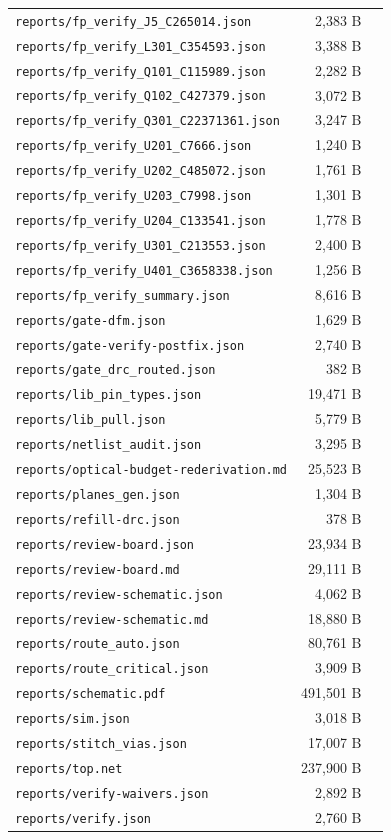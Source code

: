 \documentclass[11pt,a4paper]{article}
\begin{document}
{\begin{longtable}{p{9cm}rp{4cm}}
\texttt{reports/fp\_verify\_J5\_C265014.json} & 2,383 B &  \\
\texttt{reports/fp\_verify\_L301\_C354593.json} & 3,388 B &  \\
\texttt{reports/fp\_verify\_Q101\_C115989.json} & 2,282 B &  \\
\texttt{reports/fp\_verify\_Q102\_C427379.json} & 3,072 B &  \\
\texttt{reports/fp\_verify\_Q301\_C22371361.json} & 3,247 B &  \\
\texttt{reports/fp\_verify\_U201\_C7666.json} & 1,240 B &  \\
\texttt{reports/fp\_verify\_U202\_C485072.json} & 1,761 B &  \\
\texttt{reports/fp\_verify\_U203\_C7998.json} & 1,301 B &  \\
\texttt{reports/fp\_verify\_U204\_C133541.json} & 1,778 B &  \\
\texttt{reports/fp\_verify\_U301\_C213553.json} & 2,400 B &  \\
\texttt{reports/fp\_verify\_U401\_C3658338.json} & 1,256 B &  \\
\texttt{reports/fp\_verify\_summary.json} & 8,616 B &  \\
\texttt{reports/gate-dfm.json} & 1,629 B &  \\
\texttt{reports/gate-verify-postfix.json} & 2,740 B &  \\
\texttt{reports/gate\_drc\_routed.json} & 382 B &  \\
\texttt{reports/lib\_pin\_types.json} & 19,471 B &  \\
\texttt{reports/lib\_pull.json} & 5,779 B &  \\
\texttt{reports/netlist\_audit.json} & 3,295 B &  \\
\texttt{reports/optical-budget-rederivation.md} & 25,523 B &  \\
\texttt{reports/planes\_gen.json} & 1,304 B &  \\
\texttt{reports/refill-drc.json} & 378 B &  \\
\texttt{reports/review-board.json} & 23,934 B &  \\
\texttt{reports/review-board.md} & 29,111 B &  \\
\texttt{reports/review-schematic.json} & 4,062 B &  \\
\texttt{reports/review-schematic.md} & 18,880 B &  \\
\texttt{reports/route\_auto.json} & 80,761 B &  \\
\texttt{reports/route\_critical.json} & 3,909 B &  \\
\texttt{reports/schematic.pdf} & 491,501 B &  \\
\texttt{reports/sim.json} & 3,018 B &  \\
\texttt{reports/stitch\_vias.json} & 17,007 B &  \\
\texttt{reports/top.net} & 237,900 B &  \\
\texttt{reports/verify-waivers.json} & 2,892 B &  \\
\texttt{reports/verify.json} & 2,760 B &  \\
\bottomrule
\end{longtable}
}
\end{document}
